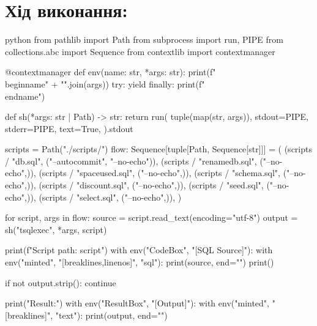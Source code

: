 \documentclass{article}
\begin{document}
    \section*{Хід виконання:}
    \begin{sciffi}{python}
        from pathlib import Path
        from subprocess import run, PIPE
        from collections.abc import Sequence
        from contextlib import contextmanager
        
        @contextmanager
        def env(name: str, *args: str):
            print(f"\\begin{{{name}}}" + "".join(args))
            try:
                yield
            finally:
                print(f"\\end{{{name}}}")

        def sh(*args: str | Path) -> str:
            return run(
                tuple(map(str, args)),
                stdout=PIPE,
                stderr=PIPE,
                text=True,
            ).stdout

        scripts = Path("./scripts/")
        flow: Sequence[tuple[Path, Sequence[str]]] = (
            (scripts / "db.sql", ("--autocommit", "--no-echo")),
            (scripts / "renamedb.sql", ("--no-echo",)),
            (scripts / "spaceused.sql", ("--no-echo",)),
            (scripts / "schema.sql", ("--no-echo",)),
            (scripts / "discount.sql", ("--no-echo",)),
            (scripts / "seed.sql", ("--no-echo",)),
            (scripts / "select.sql", ("--no-echo",)),
        )

        for script, args in flow:
            source = script.read_text(encoding="utf-8")
            output = sh("tsqlexec", *args, script)

            print(f"Script path: {script}")
            with env("CodeBox", "[SQL Source]"):
                with env("minted", "[breaklines,linenos]", "{sql}"):
                    print(source, end="")
            print()

            if not output.strip():
                continue

            print("Result:")
            with env("ResultBox", "[Output]"):
                with env("minted", "[breaklines]", "{text}"):
                    print(output, end="")
    \end{sciffi}

    \newpage
\end{document}
